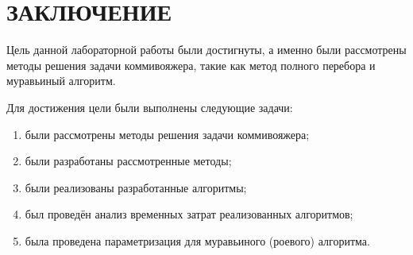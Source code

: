 \section*{\centering ЗАКЛЮЧЕНИЕ}

Цель данной лабораторной работы были достигнуты, а именно были рассмотрены методы решения задачи коммивояжера, такие как метод полного перебора и муравьиный алгоритм.

Для достижения цели были выполнены следующие задачи:
\begin{enumerate}
	\item были рассмотрены методы решения задачи коммивояжера;
	\item были разработаны рассмотренные методы;
	\item были реализованы разработанные алгоритмы;
	\item был проведён анализ временных затрат реализованных алгоритмов;
	\item была проведена параметризация для муравьиного (роевого) алгоритма.
\end{enumerate}
